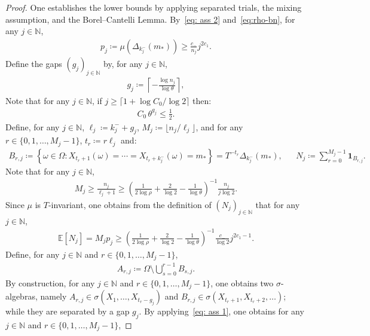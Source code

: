 \documentclass[12pt,reqno]{amsart}
\theoremstyle{definition}
\theoremstyle{plain}
\begin{document}
\begin{proof}
One establishes the lower bounds by applying separated trials, the mixing assumption, and the Borel--Cantelli Lemma.
By~\eqref{eq: ass 2} and~\eqref{eq:rho-bn}, for any $j\in\mathbb{N}$,
\begin{align*}
    p_j\coloneqq \mu{\left(\Delta_{k^-_j}{\left({m_*}\right)}\right)}\geq \frac{c_-}{n_j}j^{2c_1}.
\end{align*}
Define the gaps $(g_j)_{j\in\mathbb{N}}$ by, for any $j\in\mathbb{N}$,
\begin{align*}
    g_j \coloneqq \left\lceil -\frac{\log n_j}{\log{\theta}}\right\rceil,
\end{align*}
Note that for any $j\in\mathbb{N}$, if $j\geq\lceil{1+\log{C_0}/\log{2}\rceil}$ then:
\begin{align}\label{eq:gap-choice}
    C_0\,\theta^{g_j}\leq \frac12.
\end{align}
Define, for any $j\in\mathbb{N}$, $\ell_j\coloneqq k^-_j+g_j$, $M_j\coloneqq \lfloor{n_j}/{\ell_j}\rfloor$, and for any $r\in\{0,1,\dots,M_j-1\}$, $t_r\coloneqq r\ell_j$ and:
\begin{align*}
    B_{r,j}
    \coloneqq
    \left\{\omega\in\Omega:X_{t_r+1}(\omega)=\cdots=X_{t_r+k^-_j}(\omega)=m_*\right\}
    =T^{-t_r}\Delta_{k^-_j}{\left({m_*}\right)},
    &&
    N_j
    \coloneqq
    \sum_{r=0}^{M_j-1}\mathbf 1_{B_{r,j}}.
\end{align*}
Note that for any $j\in\mathbb{N}$,
\begin{align*}
    M_j
    \geq\frac{n_j}{\ell_j+1}
    \geq\left(\frac{1}{2\log{\rho}}+\frac{2}{\log{2}}-\frac{1}{\log{\theta}}\right)^{-1}\frac{n_j}{j\log{2}}.
\end{align*}
Since $\mu$ is $T$-invariant, one obtains from the definition of $(N_j)_{j\in\mathbb{N}}$ that for any $j\in\mathbb{N}$,
\begin{align}
\label{eq: ENj}
    \mathbb{E}[N_j]=M_jp_j
    \geq \left(\frac{1}{2\log{\rho}}+\frac{2}{\log{2}}-\frac{1}{\log{\theta}}\right)^{-1}\frac{c_-}{\log{2}}j^{2c_1-1}.
\end{align}
Define, for any $j\in\mathbb{N}$ and $r\in\{0,1,\dots,M_j-1\}$,
\begin{align*}
    A_{r,j}\coloneqq \Omega\setminus \bigcup_{s=0}^{r-1}B_{s,j}.
\end{align*}
By construction, for any $j\in\mathbb{N}$ and $r\in\{0,1,\dots,M_j-1\}$, one obtains two $\sigma$-algebras, namely $A_{r,j}\in\sigma(X_1,\dots,X_{t_r-g_j})$ and $B_{r,j}\in\sigma(X_{t_r+1},X_{t_r+2},\dots)$; while they are separated by a gap $g_j$. By applying~\eqref{eq: ass 1}, one obtains for any $j\in\mathbb{N}$ and $r\in\{0,1,\dots,M_j-1\}$,

\end{proof}
\end{document}
